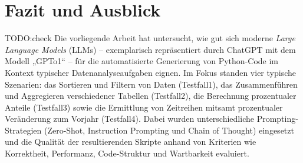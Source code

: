 \documentclass[11pt,a4paper]{article}
\begin{document}
\section{Fazit und Ausblick}
\label{sec:fazit}
TODO:check
Die vorliegende Arbeit hat untersucht, wie gut sich moderne \emph{Large Language Models} (LLMs) – exemplarisch repräsentiert durch ChatGPT mit dem Modell „GPTo1“ – für die automatisierte Generierung von Python-Code im Kontext typischer Datenanalyseaufgaben eignen. Im Fokus standen vier typische Szenarien: das Sortieren und Filtern von Daten (Testfall1), das Zusammenführen und Aggregieren verschiedener Tabellen (Testfall2), die Berechnung prozentualer Anteile (Testfall3) sowie die Ermittlung von Zeitreihen mitsamt prozentualer Veränderung zum Vorjahr (Testfall4). Dabei wurden unterschiedliche Prompting-Strategien (Zero-Shot, Instruction Prompting und Chain of Thought) eingesetzt und die Qualität der resultierenden Skripte anhand von Kriterien wie Korrektheit, Performanz, Code-Struktur und Wartbarkeit evaluiert.
\end{document}
